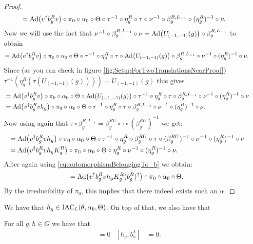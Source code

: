 \documentclass[11pt,a4paper,twoside]{article}
\numberwithin{equation}{section}
\begin{document}
\begin{proof}
\begin{align}
			&=\Ad{v^\dagger b_g^R v}\circ\pi_0\circ\alpha_0\circ\Theta\circ\tau^{-1}\circ\eta_g^R\circ\tau\circ\nu^{-1}\circ\beta_g^{R,L_{-1}}\circ(\eta_g^R)^{-1}\circ\nu.
		\end{align}
		Now we will use the fact that $\nu^{-1}\circ\beta_g^{R,L_{-1}}\circ\nu=\Ad{U_{(-1,-1)}(g)}\circ\beta_g^{R,L_{-1}}$ to obtain
		\begin{equation}
			=\Ad{v^\dagger b_g^R v}\circ\pi_0\circ\alpha_0\circ\Theta\circ\tau^{-1}\circ\eta_g^R\circ\tau\circ\Ad{U_{(-1,-1)}(g)}\circ\beta_g^{R,L_{-1}}\circ\nu^{-1}\circ(\eta_g^R)^{-1}\circ\nu.
		\end{equation}
		Since (as you can check in figure \ref{fig:SetupForTwoTranslationsNearProof}) $\tau^{-1}(\eta_g^R(\tau(U_{(-1,-1)}(g))))=U_{(-1,-1)}(g)$ this gives
		\begin{align}
			&=\Ad{v^\dagger b_g^R v}\circ\pi_0\circ\alpha_0\circ\Theta\circ\Ad{U_{(-1,-1)}(g)}\circ\tau^{-1}\circ\eta_g^R\circ\tau\circ\beta_g^{R,L_{-1}}\circ\nu^{-1}\circ(\eta_g^R)^{-1}\circ\nu\\
			&=\Ad{v^\dagger b_g^R vh_g}\circ\pi_0\circ\alpha_0\circ\Theta\circ\tau^{-1}\circ\eta_g^R\circ\tau\circ\beta_g^{R,L_{-1}}\circ\nu^{-1}\circ(\eta_g^R)^{-1}\circ\nu.
		\end{align}
		Now using again that $\tau\circ\beta_g^{R,L_{-1}}=\beta_{g}^{RU}\circ\tau\circ(\beta_g^{RU})^{-1}$ we get:
		\begin{align}
			&=\Ad{v^\dagger b_g^R vh_g}\circ\pi_0\circ\alpha_0\circ\Theta\circ\tau^{-1}\circ\eta_g^R\circ\beta_{g}^{RU}\circ\tau\circ(\beta_g^{RU})^{-1}\circ\nu^{-1}\circ(\eta_g^R)^{-1}\circ\nu\\
			&=\Ad{v^\dagger b_g^R vh_gK_g^R}\circ\pi_0\circ\alpha_0\circ\Theta\circ\eta_g^R\circ\nu^{-1}\circ(\eta_g^R)^{-1}\circ\nu.
		\end{align}
		After again using \eqref{eq:automorphismBelongingTo_b} we obtain:
		\begin{align}
			=\Ad{v^\dagger b_g^R vh_gK_g^R(b_g^R)^\dagger}\circ\pi_0\circ\alpha_0\circ\Theta.
		\end{align}
		By the irreducibility of $\pi_0$, this implies that there indeed exists such an $\alpha$.
	\end{proof}
	We have that $h_g\in\textrm{IAC}_L(\theta,\alpha_0,\Theta)$. On top of that, we also have that
	\begin{lemma}\label{lem:W_g_And_h_g_Commute}
		For all $g,h\in G$ we have that
		\begin{align}
			[h_g,W_h]&=0&[h_g,b_h^L]&=0.
		\end{align}
	\end{lemma}
\end{document}
